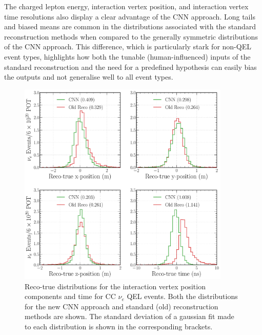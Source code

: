 The charged lepton energy, interaction vertex position, and interaction vertex time resolutions
also display a clear advantage of the CNN approach. Long tails and biased means are common in the
distributions associated with the standard reconstruction methods when compared to the generally
symmetric distributions of the CNN approach. This difference, which is particularly stark for
non-QEL event types, highlights how both the tunable (human-influenced) inputs of the standard
reconstruction and the need for a predefined hypothesis can easily bias the outputs and not
generalise well to all event types.

\begin{figure} %
    \includegraphics[width=0.9\textwidth]{diagrams/7-results/final_vertex_nuel_res_comparison.pdf}
    \caption[Reco-true distributions for the interaction vertex parameters for CC $\nu_{e}$ QEL
        events] {Reco-true distributions for the interaction vertex position components and time
        for CC $\nu_{e}$ QEL events. Both the distributions for the new CNN approach and standard
        (old) reconstruction methods are shown. The standard deviation of a gaussian fit made to
        each distribution is shown in the corresponding brackets.}
    \label{fig:final_vertex_nuel_res_comparison}
\end{figure}

